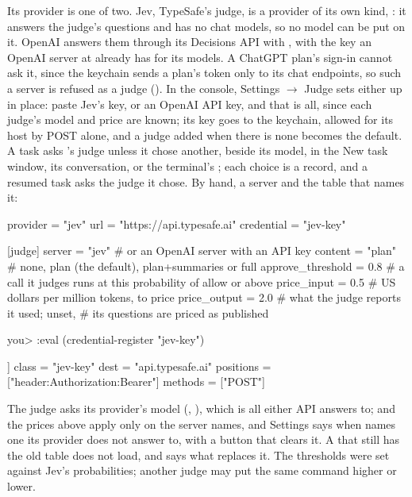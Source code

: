 Its provider is one of two. Jev, TypeSafe's judge, is a provider of its
own kind, : it answers the judge's questions and has no chat
models, so no model can be put on it. OpenAI answers them through its
Decisions API with , with the key an OpenAI server at
 already has for its models. A ChatGPT
plan's sign-in cannot ask it, since the keychain sends a plan's token only
to its chat endpoints, so such a server is refused as a judge ().
In the console, Settings \(\rightarrow\) Judge sets either up in place:
paste Jev's key, or an OpenAI API key, and that is all, since each judge's
model and price are known; its key goes to the keychain, allowed for its
host by POST alone, and a judge added when there is none becomes the
default. A task asks \code{[judge]}'s judge unless it chose another, beside
its model, in the New task window, its conversation, or the terminal's
; each choice is a  record, and a resumed
task asks the judge it chose. By hand, a server and the \code{[judge]}
table that names it:

\begin{toml}
provider = "jev"
url = "https://api.typesafe.ai"
credential = "jev-key"

[judge]
server = "jev"                    # or an OpenAI server with an API key
content = "plan"                  # none, plan (the default), plan+summaries or full
approve_threshold = 0.8           # a call it judges runs at this probability of allow or above
price_input = 0.5                 # US dollars per million tokens, to price
price_output = 2.0                #   what the judge reports it used; unset,
                                  #   its questions are priced as published
\end{toml}

\begin{txt}
you> :eval (credential-register "jev-key")
\end{txt}

\begin{toml}
[[bind]]
class = "jev-key"
dest = "api.typesafe.ai"
positions = ["header:Authorization:Bearer"]
methods = ["POST"]
\end{toml}

The judge asks its provider's model (, ),
which is all either API answers to;  and the prices above apply
only on the server \code{[judge]} names, and Settings says when
 names one its provider does not answer to, with a button that
clears it. A  that still has the
old \code{[jev]} table does not load, and says what replaces it. The
thresholds were set against Jev's probabilities; another judge may put the
same command higher or lower.

